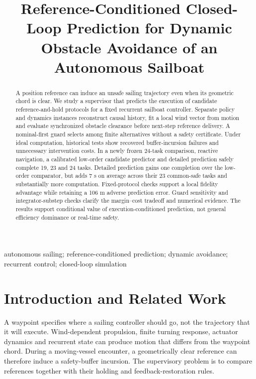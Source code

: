 \documentclass[conference]{IEEEtran}
\begin{document}
\title{Reference-Conditioned Closed-Loop Prediction for Dynamic Obstacle Avoidance of an Autonomous Sailboat}

\author{}
\maketitle

\begin{abstract}
A position reference can induce an unsafe sailing trajectory even when its geometric chord is clear. We study a supervisor that predicts the execution of candidate reference-and-hold protocols for a fixed recurrent sailboat controller. Separate policy and dynamics instances reconstruct causal history, fit a local wind vector from motion and evaluate synchronized obstacle clearance before next-step reference delivery. A nominal-first guard selects among finite alternatives without a safety certificate. Under ideal computation, historical tests show recovered buffer-incursion failures and unnecessary intervention costs. In a newly frozen 24-task comparison, reactive navigation, a calibrated low-order candidate predictor and detailed prediction safely complete 19, 23 and 24 tasks. Detailed prediction gains one completion over the low-order comparator, but adds 7 s on average across their 23 common-safe tasks and substantially more computation. Fixed-protocol checks support a local fidelity advantage while retaining a 106 m adverse prediction error. Guard sensitivity and integrator-substep checks clarify the margin--cost tradeoff and numerical evidence. The results support conditional value of execution-conditioned prediction, not general efficiency dominance or real-time safety.
\end{abstract}

\begin{IEEEkeywords}autonomous sailing; reference-conditioned prediction; dynamic avoidance; recurrent control; closed-loop simulation\end{IEEEkeywords}

\section{Introduction and Related Work}

A waypoint specifies where a sailing controller should go, not the trajectory that it will execute. Wind-dependent propulsion, finite turning response, actuator dynamics and recurrent state can produce motion that differs from the waypoint chord. During a moving-vessel encounter, a geometrically clear reference can therefore induce a safety-buffer incursion. The supervisory problem is to compare references together with their holding and feedback-restoration rules.
\end{document}
